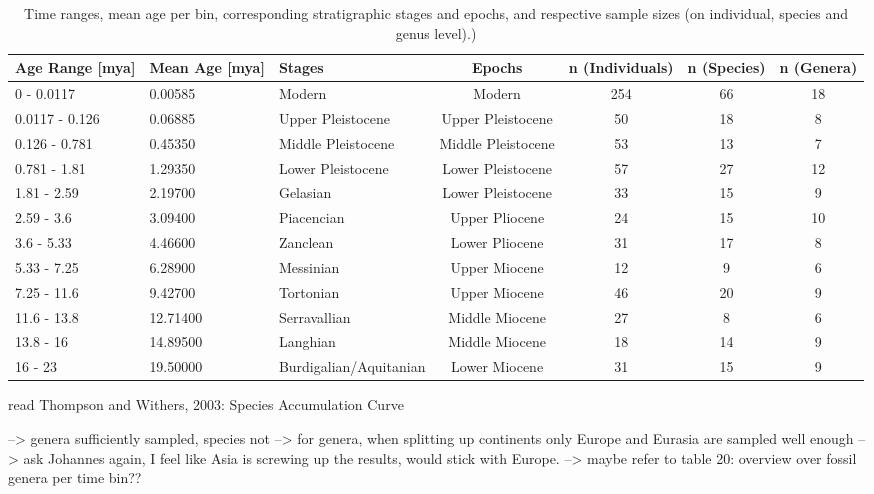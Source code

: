 \begin{landscape}\label{data}
\begin{longtable}[]{@{}lllcccc@{}}
	\caption[Sample sizes per time bins]{Time ranges, mean age per bin, corresponding stratigraphic stages and epochs, and respective sample sizes (on individual, species and genus level).)}
	\label{tab:bins}\tabularnewline
	\toprule
	Age Range [mya] & Mean Age [mya] & Stages & Epochs & n (Individuals) & n (Species) & n (Genera)\tabularnewline
	\midrule
	\endhead
	0 - 0.0117 & 0.00585 & Modern & Modern & 254 & 66 & 18\tabularnewline
	0.0117 - 0.126 & 0.06885 & Upper Pleistocene & Upper Pleistocene & 50
	& 18 & 8\tabularnewline
	0.126 - 0.781 & 0.45350 & Middle Pleistocene & Middle Pleistocene & 53
	& 13 & 7\tabularnewline
	0.781 - 1.81 & 1.29350 & Lower Pleistocene & Lower Pleistocene & 57 &
	27 & 12\tabularnewline
	1.81 - 2.59 & 2.19700 & Gelasian & Lower Pleistocene & 33 & 15 &
	9\tabularnewline
	2.59 - 3.6 & 3.09400 & Piacencian & Upper Pliocene & 24 & 15 &
	10\tabularnewline
	3.6 - 5.33 & 4.46600 & Zanclean & Lower Pliocene & 31 & 17 &
	8\tabularnewline
	5.33 - 7.25 & 6.28900 & Messinian & Upper Miocene & 12 & 9 &
	6\tabularnewline
	7.25 - 11.6 & 9.42700 & Tortonian & Upper Miocene & 46 & 20 &
	9\tabularnewline
	11.6 - 13.8 & 12.71400 & Serravallian & Middle Miocene & 27 & 8 &
	6\tabularnewline
	13.8 - 16 & 14.89500 & Langhian & Middle Miocene & 18 & 14 &
	9\tabularnewline
	16 - 23 & 19.50000 & Burdigalian/Aquitanian & Lower Miocene & 31 & 15 & 9\tabularnewline
	\bottomrule
\end{longtable}
\end{landscape}





read Thompson and Withers, 2003: Species Accumulation Curve

--> genera sufficiently sampled, species not
--> for genera, when splitting up continents only Europe and Eurasia are sampled well enough --> ask Johannes again, I feel like Asia is screwing up the results, would stick with Europe.
--> maybe refer to table 20: overview over fossil genera per time bin??

